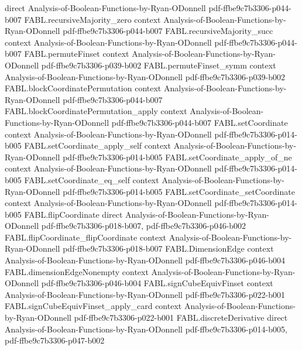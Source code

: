 \begin{theorem}
  {direct}
  {Analysis-of-Boolean-Functions-by-Ryan-ODonnell}
  {pdf-ffbe9c7b3306-p044-b007}
\proofstep
  {FABL.recursiveMajority_zero}
  {context}
  {Analysis-of-Boolean-Functions-by-Ryan-ODonnell}
  {pdf-ffbe9c7b3306-p044-b007}
\proofstep
  {FABL.recursiveMajority_succ}
  {context}
  {Analysis-of-Boolean-Functions-by-Ryan-ODonnell}
  {pdf-ffbe9c7b3306-p044-b007}
\proofstep
  {FABL.permuteFinset}
  {context}
  {Analysis-of-Boolean-Functions-by-Ryan-ODonnell}
  {pdf-ffbe9c7b3306-p039-b002}
\proofstep
  {FABL.permuteFinset_symm}
  {context}
  {Analysis-of-Boolean-Functions-by-Ryan-ODonnell}
  {pdf-ffbe9c7b3306-p039-b002}
\proofstep
  {FABL.blockCoordinatePermutation}
  {context}
  {Analysis-of-Boolean-Functions-by-Ryan-ODonnell}
  {pdf-ffbe9c7b3306-p044-b007}
\proofstep
  {FABL.blockCoordinatePermutation_apply}
  {context}
  {Analysis-of-Boolean-Functions-by-Ryan-ODonnell}
  {pdf-ffbe9c7b3306-p044-b007}
\proofstep
  {FABL.setCoordinate}
  {context}
  {Analysis-of-Boolean-Functions-by-Ryan-ODonnell}
  {pdf-ffbe9c7b3306-p014-b005}
\proofstep
  {FABL.setCoordinate_apply_self}
  {context}
  {Analysis-of-Boolean-Functions-by-Ryan-ODonnell}
  {pdf-ffbe9c7b3306-p014-b005}
\proofstep
  {FABL.setCoordinate_apply_of_ne}
  {context}
  {Analysis-of-Boolean-Functions-by-Ryan-ODonnell}
  {pdf-ffbe9c7b3306-p014-b005}
\proofstep
  {FABL.setCoordinate_eq_self}
  {context}
  {Analysis-of-Boolean-Functions-by-Ryan-ODonnell}
  {pdf-ffbe9c7b3306-p014-b005}
\proofstep
  {FABL.setCoordinate_setCoordinate}
  {context}
  {Analysis-of-Boolean-Functions-by-Ryan-ODonnell}
  {pdf-ffbe9c7b3306-p014-b005}
\proofstep
  {FABL.flipCoordinate}
  {direct}
  {Analysis-of-Boolean-Functions-by-Ryan-ODonnell}
  {pdf-ffbe9c7b3306-p018-b007,
    pdf-ffbe9c7b3306-p046-b002}
\proofstep
  {FABL.flipCoordinate_flipCoordinate}
  {context}
  {Analysis-of-Boolean-Functions-by-Ryan-ODonnell}
  {pdf-ffbe9c7b3306-p018-b007}
\proofstep
  {FABL.DimensionEdge}
  {context}
  {Analysis-of-Boolean-Functions-by-Ryan-ODonnell}
  {pdf-ffbe9c7b3306-p046-b004}
\proofstep
  {FABL.dimensionEdgeNonempty}
  {context}
  {Analysis-of-Boolean-Functions-by-Ryan-ODonnell}
  {pdf-ffbe9c7b3306-p046-b004}
\proofstep
  {FABL.signCubeEquivFinset}
  {context}
  {Analysis-of-Boolean-Functions-by-Ryan-ODonnell}
  {pdf-ffbe9c7b3306-p022-b001}
\proofstep
  {FABL.signCubeEquivFinset_apply_card}
  {context}
  {Analysis-of-Boolean-Functions-by-Ryan-ODonnell}
  {pdf-ffbe9c7b3306-p022-b001}
\proofstep
  {FABL.discreteDerivative}
  {direct}
  {Analysis-of-Boolean-Functions-by-Ryan-ODonnell}
  {pdf-ffbe9c7b3306-p014-b005,
    pdf-ffbe9c7b3306-p047-b002}

\end{theorem}

